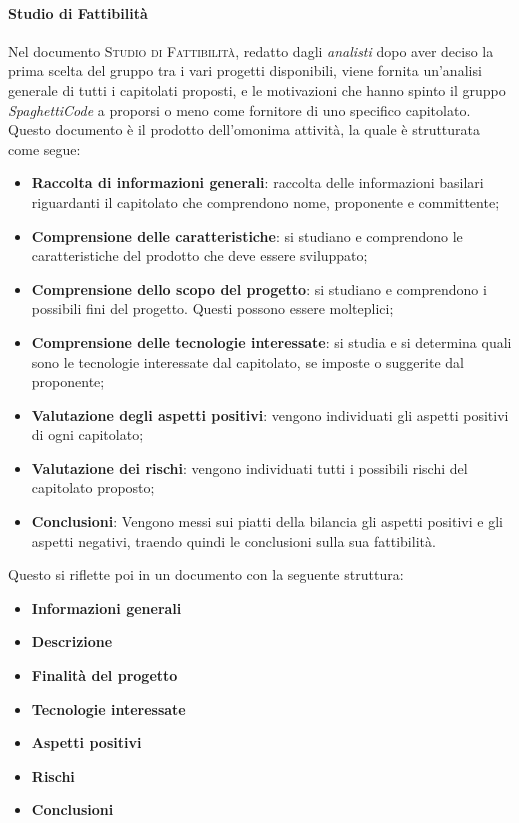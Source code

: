 \documentclass[../norme-di-progetto.tex]{subfiles}
\begin{document}
\paragraph{Studio di Fattibilità}
Nel documento \textsc{Studio di Fattibilità}, redatto dagli \emph{analisti} dopo aver deciso la prima scelta del gruppo tra i vari progetti disponibili, viene fornita un'analisi generale di tutti i capitolati proposti, e le motivazioni che hanno spinto il gruppo \emph{SpaghettiCode} a proporsi o meno come fornitore di uno specifico capitolato. Questo documento è il prodotto dell'omonima attività, la quale è strutturata come segue: 
\begin{itemize}
    \item \textbf{Raccolta di informazioni generali}: raccolta delle informazioni basilari riguardanti il capitolato che comprendono nome, proponente e committente;
    \item \textbf{Comprensione delle caratteristiche}: si studiano e comprendono le caratteristiche del prodotto che deve essere sviluppato;
    \item \textbf{Comprensione dello scopo del progetto}: si studiano e comprendono i possibili fini del progetto. Questi possono essere molteplici;
    \item \textbf{Comprensione delle tecnologie interessate}: si studia e si determina quali sono le tecnologie interessate dal capitolato, se imposte o suggerite dal proponente;
    \item \textbf{Valutazione degli aspetti positivi}: vengono individuati gli aspetti positivi di ogni capitolato;
    \item \textbf{Valutazione dei rischi}: vengono individuati tutti i possibili rischi del capitolato proposto;  
    \item \textbf{Conclusioni}: Vengono messi sui piatti della bilancia gli aspetti positivi e gli aspetti negativi, traendo quindi le conclusioni sulla sua fattibilità.
\end{itemize}
Questo si riflette poi in un documento con la seguente struttura:
\begin{itemize}
    \item \textbf{Informazioni generali}
    \item \textbf{Descrizione}
    \item \textbf{Finalità del progetto}
    \item \textbf{Tecnologie interessate}
    \item \textbf{Aspetti positivi}
    \item \textbf{Rischi}
    \item \textbf{Conclusioni}
\end{itemize}
\end{document}
